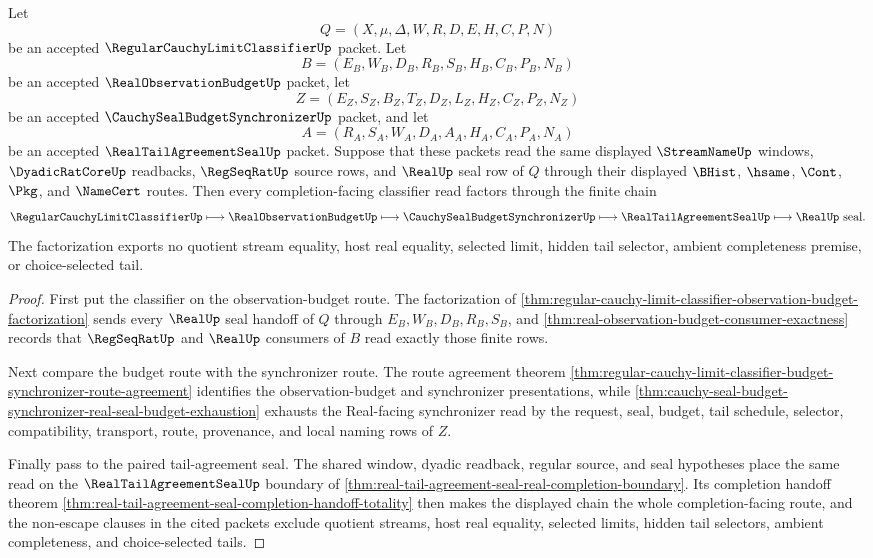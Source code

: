 \begin{theorem}
\label{thm:regular-cauchy-limit-classifier-real-tail-agreement-seal-factorization}
Let
$$
Q=(X,\mu,\Delta,W,R,D,E,H,C,P,N)
$$
be an accepted $\RegularCauchyLimitClassifierUp$ packet. Let
$$
B=(E_B,W_B,D_B,R_B,S_B,H_B,C_B,P_B,N_B)
$$
be an accepted $\RealObservationBudgetUp$ packet, let
$$
Z=(E_Z,S_Z,B_Z,T_Z,D_Z,L_Z,H_Z,C_Z,P_Z,N_Z)
$$
be an accepted $\CauchySealBudgetSynchronizerUp$ packet, and let
$$
A=(R_A,S_A,W_A,D_A,A_A,H_A,C_A,P_A,N_A)
$$
be an accepted $\RealTailAgreementSealUp$ packet. Suppose that these packets read the same displayed $\StreamNameUp$ windows, $\DyadicRatCoreUp$ readbacks, $\RegSeqRatUp$ source rows, and $\RealUp$ seal row of $Q$ through their displayed $\BHist$, $\hsame$, $\Cont$, $\Pkg$, and $\NameCert$ routes. Then every completion-facing classifier read factors through the finite chain
$$
\RegularCauchyLimitClassifierUp \longmapsto \RealObservationBudgetUp \longmapsto \CauchySealBudgetSynchronizerUp \longmapsto \RealTailAgreementSealUp \longmapsto \RealUp \text{ seal}.
$$
The factorization exports no quotient stream equality, host real equality, selected limit, hidden tail selector, ambient completeness premise, or choice-selected tail.
\end{theorem}
\begin{proof}
First put the classifier on the observation-budget route. The factorization of \autoref{thm:regular-cauchy-limit-classifier-observation-budget-factorization} sends every $\RealUp$ seal handoff of $Q$ through $E_B,W_B,D_B,R_B,S_B$, and \autoref{thm:real-observation-budget-consumer-exactness} records that $\RegSeqRatUp$ and $\RealUp$ consumers of $B$ read exactly those finite rows.

Next compare the budget route with the synchronizer route. The route agreement theorem \autoref{thm:regular-cauchy-limit-classifier-budget-synchronizer-route-agreement} identifies the observation-budget and synchronizer presentations, while \autoref{thm:cauchy-seal-budget-synchronizer-real-seal-budget-exhaustion} exhausts the Real-facing synchronizer read by the request, seal, budget, tail schedule, selector, compatibility, transport, route, provenance, and local naming rows of $Z$.

Finally pass to the paired tail-agreement seal. The shared window, dyadic readback, regular source, and seal hypotheses place the same read on the $\RealTailAgreementSealUp$ boundary of \autoref{thm:real-tail-agreement-seal-real-completion-boundary}. Its completion handoff theorem \autoref{thm:real-tail-agreement-seal-completion-handoff-totality} then makes the displayed chain the whole completion-facing route, and the non-escape clauses in the cited packets exclude quotient streams, host real equality, selected limits, hidden tail selectors, ambient completeness, and choice-selected tails.
\end{proof}

